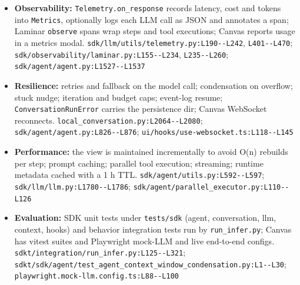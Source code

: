 \begin{itemize}
\item \textbf{Observability:} \texttt{Telemetry.\allowbreak{}on\_\allowbreak{}response} records latency, cost and tokens into \texttt{Metrics}, optionally logs each LLM call as JSON and annotates a span; Laminar \texttt{observe} spans wrap steps and tool executions; Canvas reports usage in a metrics modal. \texttt{sdk/\allowbreak{}llm/\allowbreak{}utils/\allowbreak{}telemetry.\allowbreak{}py:\allowbreak{}L190-\allowbreak{}-\allowbreak{}L242}, \texttt{L401-\allowbreak{}-\allowbreak{}L470}; \texttt{sdk/\allowbreak{}observability/\allowbreak{}laminar.\allowbreak{}py:\allowbreak{}L155-\allowbreak{}-\allowbreak{}L234}, \texttt{L235-\allowbreak{}-\allowbreak{}L260}; \texttt{sdk/\allowbreak{}agent/\allowbreak{}agent.\allowbreak{}py:\allowbreak{}L1527-\allowbreak{}-\allowbreak{}L1537}
\item \textbf{Resilience:} retries and fallback on the model call; condensation on overflow; stuck nudge; iteration and budget caps; event-log resume; \texttt{ConversationRunError} carries the persistence dir; Canvas WebSocket reconnects. \texttt{local\_\allowbreak{}conversation.\allowbreak{}py:\allowbreak{}L2064-\allowbreak{}-\allowbreak{}L2080}; \texttt{sdk/\allowbreak{}agent/\allowbreak{}agent.\allowbreak{}py:\allowbreak{}L826-\allowbreak{}-\allowbreak{}L876}; \texttt{ui/\allowbreak{}hooks/\allowbreak{}use-\allowbreak{}websocket.\allowbreak{}ts:\allowbreak{}L118-\allowbreak{}-\allowbreak{}L145}
\item \textbf{Performance:} the view is maintained incrementally to avoid O(n) rebuilds per step; prompt caching; parallel tool execution; streaming; runtime metadata cached with a 1 h TTL. \texttt{sdk/\allowbreak{}agent/\allowbreak{}utils.\allowbreak{}py:\allowbreak{}L592-\allowbreak{}-\allowbreak{}L597}; \texttt{sdk/\allowbreak{}llm/\allowbreak{}llm.\allowbreak{}py:\allowbreak{}L1780-\allowbreak{}-\allowbreak{}L1786}; \texttt{sdk/\allowbreak{}agent/\allowbreak{}parallel\_\allowbreak{}executor.\allowbreak{}py:\allowbreak{}L110-\allowbreak{}-\allowbreak{}L126}
\item \textbf{Evaluation:} SDK unit tests under \texttt{tests/\allowbreak{}sdk} (agent, conversation, llm, context, hooks) and behavior integration tests run by \texttt{run\_\allowbreak{}infer.\allowbreak{}py}; Canvas has vitest suites and Playwright mock-LLM and live end-to-end configs. \texttt{sdkt/\allowbreak{}integration/\allowbreak{}run\_\allowbreak{}infer.\allowbreak{}py:\allowbreak{}L125-\allowbreak{}-\allowbreak{}L321}; \texttt{sdkt/\allowbreak{}sdk/\allowbreak{}agent/\allowbreak{}test\_\allowbreak{}agent\_\allowbreak{}context\_\allowbreak{}window\_\allowbreak{}condensation.\allowbreak{}py:\allowbreak{}L1-\allowbreak{}-\allowbreak{}L30}; \texttt{playwright.\allowbreak{}mock-\allowbreak{}llm.\allowbreak{}config.\allowbreak{}ts:\allowbreak{}L88-\allowbreak{}-\allowbreak{}L100}
\end{itemize}

